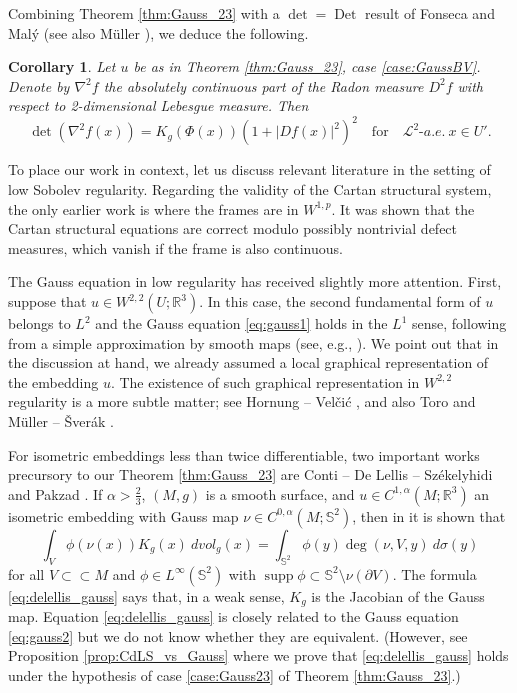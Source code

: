 \documentclass[12pt]{article}
\newcommand{\R}{\mathbb{R}}
\newcommand{\Det}{\operatorname{Det}}
\theoremstyle{plain}
\newtheorem{corollary}[theorem]{Corollary}
\numberwithin{equation}{section}
\begin{document}
Combining Theorem \ref{thm:Gauss_23} with a $\det = \Det$ result of Fonseca and Mal\'{y} \cite[Theorem 1.4]{fonseca_maly} (see also Müller \cite{mueller_det}), we deduce the following.
\begin{corollary} \label{cor:Gauss_ae}
    Let $u$ be as in Theorem \ref{thm:Gauss_23}, case \eqref{case:GaussBV}. Denote by $\nabla^2f$ the absolutely continuous part of the Radon measure $D^2f$ with respect to 2-dimensional Lebesgue measure. Then
    \begin{equation*}
        \det(\nabla^2 f(x)) = K_g(\Phi(x))(1+|Df(x)|^2)^2 \quad \text{for}\quad \mathcal{L}^2 \text{-}a.e. ~ x \in U'.
    \end{equation*}
\end{corollary}

To place our work in context, let us discuss relevant literature in the setting of low Sobolev regularity. Regarding the validity of the Cartan structural system, the only earlier work is \cite{giron_21} where the frames are in $W^{1,p}$. It was shown that the Cartan structural equations are correct modulo possibly nontrivial defect measures, which vanish if the frame is also continuous. 

The Gauss equation in low regularity has received slightly more attention. First, suppose that $u \in W^{2,2}(U; \R^3)$. In this case, the second fundamental form of $u$ belongs to $L^2$ and the Gauss equation \eqref{eq:gauss1} holds in the $L^1$ sense, following from a simple approximation by smooth maps (see, e.g., \cite[Lemma 2.2]{hornung_18}). We point out that in the discussion at hand, we already assumed a local graphical representation of the embedding $u$. The existence of such graphical representation in $W^{2,2}$ regularity is a more subtle matter; see Hornung -- Vel\v{c}i\'{c} \cite{hornung_18}, and also Toro \cite{toro_94} and Müller -- \v{S}ver\'{a}k \cite{mueller_sverak_95}.

For isometric embeddings less than twice differentiable, two important works precursory to our Theorem \ref{thm:Gauss_23} are Conti -- De Lellis -- Székelyhidi \cite{conti_deLellis_szekelyhidi_12} and Pakzad \cite{pakzad_24}. If $\alpha > \frac23$, $(M,g)$ is a smooth surface, and $u \in C^{1,\alpha}(M;\R^3)$ an isometric embedding with Gauss map $\nu \in C^{0,\alpha}(M;\mathbb{S}^2)$, then in \cite[Proposition 6]{conti_deLellis_szekelyhidi_12} it is shown that
\begin{equation} \label{eq:delellis_gauss}
        \int_V \phi(\nu(x)) K_g(x)~dvol_g(x) = \int_{\mathbb{S}^2} \phi(y) \operatorname{deg}(\nu, V, y) ~d\sigma(y)
\end{equation}
for all $V \subset \subset M$ and $\phi \in L^\infty(\mathbb{S}^2)$ with $\operatorname{supp}\phi \subset \mathbb{S}^2\setminus \nu(\partial V)$. The formula \eqref{eq:delellis_gauss} says that, in a weak sense, $K_g$ is the Jacobian of the Gauss map. Equation \eqref{eq:delellis_gauss} is closely related to the Gauss equation \eqref{eq:gauss2} but we do not know whether they are equivalent. (However, see Proposition \ref{prop:CdLS_vs_Gauss} where we prove that \eqref{eq:delellis_gauss} holds under the hypothesis of case \eqref{case:Gauss23} of Theorem \ref{thm:Gauss_23}.) 
\end{document}
